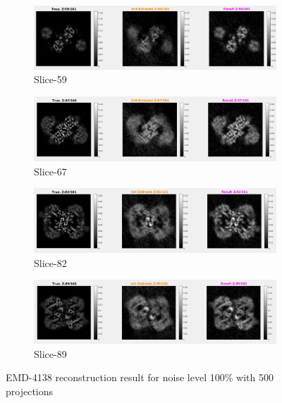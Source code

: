 \documentclass{report}
\begin{document}
\begin{figure}[H]
\centering

\begin{subfigure}{1\textwidth}
\centering
\includegraphics[width=1\linewidth]{emd_4138_result_1.png}
\captionsetup{justification=centering}
\caption{ Slice-59 }
\end{subfigure} 

\begin{subfigure}{1\textwidth}
\centering
\includegraphics[width=1\linewidth]{emd_4138_result_2.png}
\captionsetup{justification=centering}
\caption{ Slice-67 }
\end{subfigure} 

\begin{subfigure}{1\textwidth}
\centering
\includegraphics[width=1\linewidth]{emd_4138_result_3.png}
\captionsetup{justification=centering}
\caption{ Slice-82 }
\end{subfigure} 

\begin{subfigure}{1\textwidth}
\centering
\includegraphics[width=1\linewidth]{emd_4138_result_4.png}
\captionsetup{justification=centering}
\caption{ Slice-89 }
\end{subfigure} 


\caption{EMD-4138 reconstruction result for noise level 100\% with 500 projections}
\label{fig:EMD-4138 Reconstruction: Result-noise 100}
\end{figure}
\end{document}
